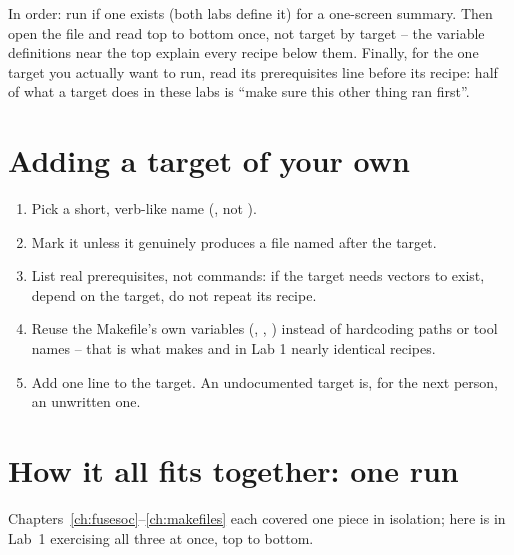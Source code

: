 In order: run  if one exists (both labs define it) for a
one-screen summary. Then open the file and read top to bottom once, not
target by target -- the variable definitions near the top explain every
recipe below them. Finally, for the one target you actually want to run,
read its prerequisites line before its recipe: half of what a target does
in these labs is ``make sure this other thing ran first''.

\section{Adding a target of your own}

\begin{enumerate}
  \item Pick a short, verb-like name (, not
        ).
  \item Mark it  unless it genuinely produces a file named
        after the target.
  \item List real prerequisites, not commands: if the target needs vectors
        to exist, depend on the  target, do not repeat its
        recipe.
  \item Reuse the Makefile's own variables (,
        , ) instead of hardcoding paths or
        tool names -- that is what makes  and  in Lab 1 nearly identical recipes.
  \item Add one line to the  target. An undocumented target is,
        for the next person, an unwritten one.
\end{enumerate}

\section{How it all fits together: one  run}
\label{sec:makefiles:walkthrough}

Chapters~\ref{ch:fusesoc}--\ref{ch:makefiles} each covered one piece in
isolation; here is  in Lab~1 exercising all three at once,
top to bottom.

